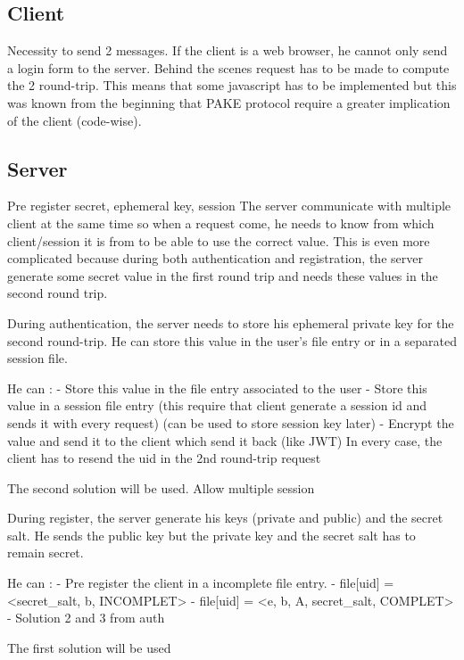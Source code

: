 \documentclass[../report.tex]{subfiles}
\begin{document}
\subsection{Client}
Necessity to send 2 messages. If the client is a web browser, he cannot only send a login form to the server. Behind the scenes request has to be made to compute the 2 round-trip. This means that some javascript has to be implemented but this was known from the beginning that PAKE protocol require a greater implication of the client (code-wise).

\subsection{Server}
Pre register secret, ephemeral key, session
The server communicate with multiple client at the same time so when a request come, he needs to know from which client/session it is from to be able to use the correct value. This is even more complicated because during both authentication and registration, the server generate some secret value in the first round trip and needs these values in the second round trip.



During authentication, the server needs to store his ephemeral private key for the second round-trip. He can store this value in the user's file entry or in a separated session file.

He can :
- Store this value in the file entry associated to the user
- Store this value in a session file entry (this require that client generate a session id and sends it with every request) (can be used to store session key later)
- Encrypt the value and send it to the client which send it back (like JWT)
In every case, the client has to resend the uid in the 2nd round-trip request

The second solution will be used. Allow multiple session
 


During register, the server generate his keys (private and public) and the secret salt. He sends the public key but the private key and the secret salt has to remain secret.

He can :
- Pre register the client in a incomplete file entry.
   - file[uid] = <secret\_salt, b, INCOMPLET>
   - file[uid] = <e, b, A, secret\_salt, COMPLET>
- Solution 2 and 3 from auth

The first solution will be used
\end{document}
